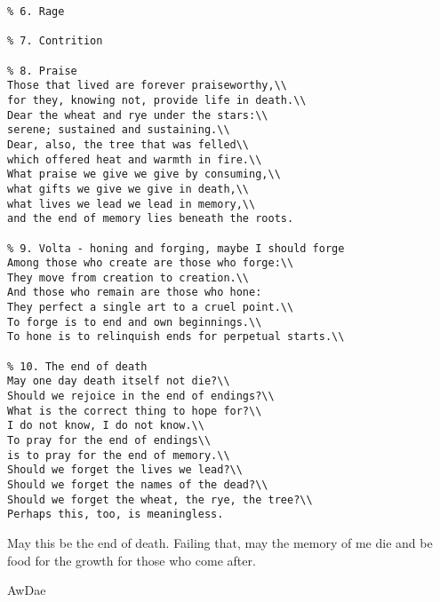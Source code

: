 \begin{verbatim}
% 6. Rage

% 7. Contrition

% 8. Praise
Those that lived are forever praiseworthy,\\
for they, knowing not, provide life in death.\\
Dear the wheat and rye under the stars:\\
serene; sustained and sustaining.\\
Dear, also, the tree that was felled\\
which offered heat and warmth in fire.\\
What praise we give we give by consuming,\\
what gifts we give we give in death,\\
what lives we lead we lead in memory,\\
and the end of memory lies beneath the roots.

% 9. Volta - honing and forging, maybe I should forge
Among those who create are those who forge:\\
They move from creation to creation.\\
And those who remain are those who hone:
They perfect a single art to a cruel point.\\
To forge is to end and own beginnings.\\
To hone is to relinquish ends for perpetual starts.\\

% 10. The end of death
May one day death itself not die?\\
Should we rejoice in the end of endings?\\
What is the correct thing to hope for?\\
I do not know, I do not know.\\
To pray for the end of endings\\
is to pray for the end of memory.\\
Should we forget the lives we lead?\\
Should we forget the names of the dead?\\
Should we forget the wheat, the rye, the tree?\\
Perhaps this, too, is meaningless.
\end{verbatim}

May this be the end of death. Failing that, may the memory of me die and be food for the growth for those who come after.

AwDae
